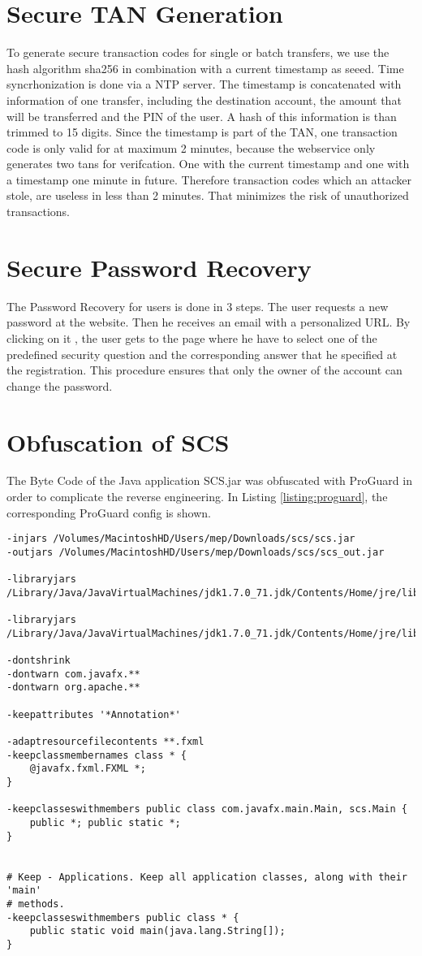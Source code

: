 \section{Secure TAN Generation}
To generate secure transaction codes for single or batch transfers, we use the hash algorithm sha256 in combination with a current timestamp as seeed. Time syncrhonization is done via a NTP server. The timestamp is concatenated with information of one transfer, including the destination account, the amount that will be transferred and the PIN of the user. A hash of this information is than trimmed to 15 digits. 
Since the timestamp is part of the TAN, one transaction code is only valid for at maximum 2 minutes, because the webservice only generates two tans for verifcation. One with the current timestamp and one with a timestamp one minute in future. Therefore transaction codes which an attacker stole, are useless in less than 2 minutes. That minimizes the risk of unauthorized transactions.
\section{Secure Password Recovery}
The Password Recovery for users is done in 3 steps. The user requests a new password at the website. Then he receives an email with a personalized URL. By clicking on it , the user gets to the page where he have to select one of the predefined security question and the corresponding answer that he specified at the registration. This procedure ensures that only the owner of the account can change the password. 
\section{Obfuscation of SCS} 
The Byte Code of the Java application SCS.jar was obfuscated with ProGuard in order to complicate the reverse engineering.
In Listing \ref{listing:proguard}, the corresponding ProGuard config is shown.

\begin{lstlisting}[caption=Configuration File of ProGuard, label=listing:proguard]
-injars /Volumes/MacintoshHD/Users/mep/Downloads/scs/scs.jar
-outjars /Volumes/MacintoshHD/Users/mep/Downloads/scs/scs_out.jar
	
-libraryjars /Library/Java/JavaVirtualMachines/jdk1.7.0_71.jdk/Contents/Home/jre/lib/rt.jar
	
-libraryjars /Library/Java/JavaVirtualMachines/jdk1.7.0_71.jdk/Contents/Home/jre/lib/jfxrt.jar
	
-dontshrink
-dontwarn com.javafx.**
-dontwarn org.apache.**
	
-keepattributes '*Annotation*'
	
-adaptresourcefilecontents **.fxml
-keepclassmembernames class * {
	@javafx.fxml.FXML *;
}
	
-keepclasseswithmembers public class com.javafx.main.Main, scs.Main {
	public *; public static *;
}
	
	
# Keep - Applications. Keep all application classes, along with their 'main'
# methods.
-keepclasseswithmembers public class * {
	public static void main(java.lang.String[]);
}
\end{lstlisting}

